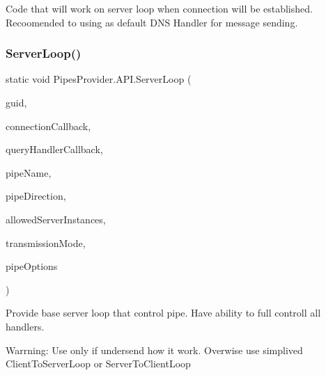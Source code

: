 Code that will work on server loop when connection will be established. Recoomended to using as default D\+NS Handler for message sending. 

\mbox{\label{class_pipes_provider_1_1_a_p_i_ab18891bb1d9c04a9c9144e0d8c89aebf}} 
\subsubsection{\texorpdfstring{Server\+Loop()}{ServerLoop()}}
{\footnotesize\ttfamily static void Pipes\+Provider.\+A\+P\+I.\+Server\+Loop (\begin{DoxyParamCaption}\item[{string}]{guid,  }\item[{System.\+Action$<$ \mbox{\hyperlink{class_pipes_provider_1_1_server_transmission_meta}{Server\+Transmission\+Meta}} $>$}]{connection\+Callback,  }\item[{System.\+Action$<$ \mbox{\hyperlink{class_pipes_provider_1_1_server_transmission_meta}{Server\+Transmission\+Meta}}, string $>$}]{query\+Handler\+Callback,  }\item[{string}]{pipe\+Name,  }\item[{Pipe\+Direction}]{pipe\+Direction,  }\item[{int}]{allowed\+Server\+Instances,  }\item[{Pipe\+Transmission\+Mode}]{transmission\+Mode,  }\item[{Pipe\+Options}]{pipe\+Options }\end{DoxyParamCaption})\hspace{0.3cm}{\ttfamily [static]}}



Provide base server loop that control pipe. Have ability to full controll all handlers. 

Warrning\+: Use only if undersend how it work. Overwise use simplived Client\+To\+Server\+Loop or Server\+To\+Client\+Loop 



